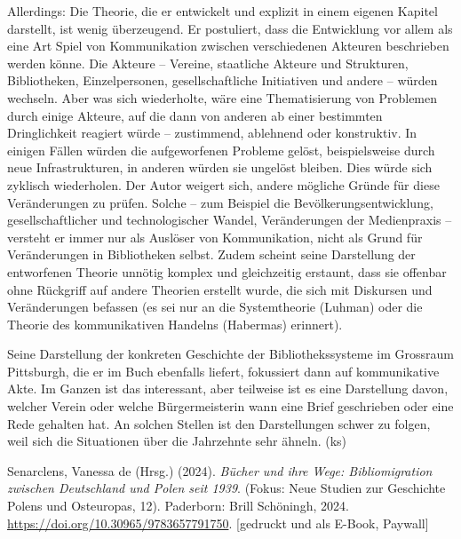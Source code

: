 \documentclass[a4paper,
fontsize=11pt,
oneside,
numbers=noperiodatend,
parskip=half-,
bibliography=totoc,
final
]{scrartcl}
\begin{document}
Allerdings: Die Theorie, die er entwickelt und explizit in einem eigenen
Kapitel darstellt, ist wenig überzeugend. Er postuliert, dass die
Entwicklung vor allem als eine Art Spiel von Kommunikation zwischen
verschiedenen Akteuren beschrieben werden könne. Die Akteure -- Vereine,
staatliche Akteure und Strukturen, Bibliotheken, Einzelpersonen,
gesellschaftliche Initiativen und andere -- würden wechseln. Aber was
sich wiederholte, wäre eine Thematisierung von Problemen durch einige
Akteure, auf die dann von anderen ab einer bestimmten Dringlichkeit
reagiert würde -- zustimmend, ablehnend oder konstruktiv. In einigen
Fällen würden die aufgeworfenen Probleme gelöst, beispielsweise durch
neue Infrastrukturen, in anderen würden sie ungelöst bleiben. Dies würde
sich zyklisch wiederholen. Der Autor weigert sich, andere mögliche
Gründe für diese Veränderungen zu prüfen. Solche -- zum Beispiel die
Bevölkerungsentwicklung, gesellschaftlicher und technologischer Wandel,
Veränderungen der Medienpraxis -- versteht er immer nur als Auslöser von
Kommunikation, nicht als Grund für Veränderungen in Bibliotheken selbst.
Zudem scheint seine Darstellung der entworfenen Theorie unnötig komplex
und gleichzeitig erstaunt, dass sie offenbar ohne Rückgriff auf andere
Theorien erstellt wurde, die sich mit Diskursen und Veränderungen
befassen (es sei nur an die Systemtheorie (Luhman) oder die Theorie des
kommunikativen Handelns (Habermas) erinnert).

Seine Darstellung der konkreten Geschichte der Bibliothekssysteme im
Grossraum Pittsburgh, die er im Buch ebenfalls liefert, fokussiert dann
auf kommunikative Akte. Im Ganzen ist das interessant, aber teilweise
ist es eine Darstellung davon, welcher Verein oder welche
Bürgermeisterin wann eine Brief geschrieben oder eine Rede gehalten hat.
An solchen Stellen ist den Darstellungen schwer zu folgen, weil sich die
Situationen über die Jahrzehnte sehr ähneln. (ks)

Senarclens, Vanessa de (Hrsg.) (2024). \emph{Bücher und ihre Wege:
Bibliomigration zwischen Deutschland und Polen seit 1939}. (Fokus: Neue
Studien zur Geschichte Polens und Osteuropas, 12). Paderborn: Brill
Schöningh, 2024. \url{https://doi.org/10.30965/9783657791750}.
{[}gedruckt und als E-Book, Paywall{]}
\end{document}

